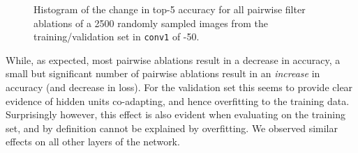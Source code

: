 \documentclass[thesis]{subfiles}
\begin{document}
\begin{figure}[tbp]
%
\caption[Pairwise filter ablations in ResNet 50]{Histogram of the change in top-5 accuracy for all pairwise filter ablations of a 2500 randomly sampled images from the  training/validation set in \texttt{conv1} of -50.}
\label{fig:resnet50ablation_conv1_top5}
\end{figure}

While, as expected, most pairwise ablations result in a decrease in accuracy, a small but significant number of pairwise ablations result in an \emph{increase} in accuracy (and decrease in loss). For the validation set this seems to provide clear evidence of hidden units co-adapting, and hence overfitting to the training data. Surprisingly however, this effect is also evident when evaluating on the training set, and by definition cannot be explained by overfitting. We observed similar effects on all other layers of the network.
\end{document}
